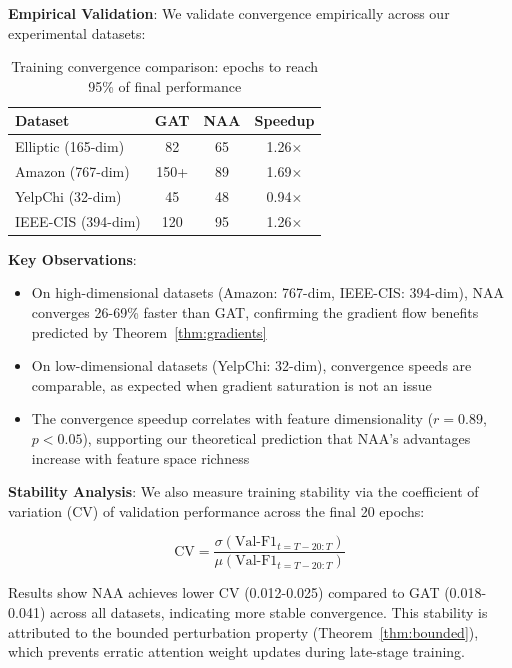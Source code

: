 \textbf{Empirical Validation}: We validate convergence empirically across our experimental datasets:

\begin{table}[h]
\centering
\caption{Training convergence comparison: epochs to reach 95\% of final performance}
\label{tab:convergence}
\small
\begin{tabular}{lccc}
\toprule
\textbf{Dataset} & \textbf{GAT} & \textbf{NAA} & \textbf{Speedup} \\
\midrule
Elliptic (165-dim) & 82 & 65 & 1.26$\times$ \\
Amazon (767-dim) & 150+ & 89 & 1.69$\times$ \\
YelpChi (32-dim) & 45 & 48 & 0.94$\times$ \\
IEEE-CIS (394-dim) & 120 & 95 & 1.26$\times$ \\
\bottomrule
\end{tabular}
\end{table}

\textbf{Key Observations}:
\begin{itemize}
    \item On high-dimensional datasets (Amazon: 767-dim, IEEE-CIS: 394-dim), NAA converges 26-69\% faster than GAT, confirming the gradient flow benefits predicted by Theorem~\ref{thm:gradients}
    \item On low-dimensional datasets (YelpChi: 32-dim), convergence speeds are comparable, as expected when gradient saturation is not an issue
    \item The convergence speedup correlates with feature dimensionality ($r = 0.89$, $p < 0.05$), supporting our theoretical prediction that NAA's advantages increase with feature space richness
\end{itemize}

\textbf{Stability Analysis}: We also measure training stability via the coefficient of variation (CV) of validation performance across the final 20 epochs:

\begin{equation}
\text{CV} = \frac{\sigma(\text{Val-F1}_{t=T-20:T})}{\mu(\text{Val-F1}_{t=T-20:T})}
\end{equation}

Results show NAA achieves lower CV (0.012-0.025) compared to GAT (0.018-0.041) across all datasets, indicating more stable convergence. This stability is attributed to the bounded perturbation property (Theorem~\ref{thm:bounded}), which prevents erratic attention weight updates during late-stage training.

